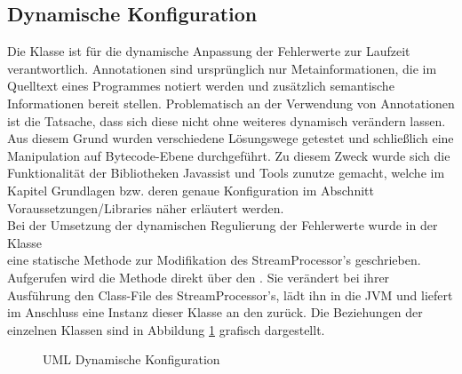 \subsection{Dynamische Konfiguration}

Die Klasse  ist f\"ur die dynamische Anpassung der Fehlerwerte zur Laufzeit verantwortlich. Annotationen sind urspr\"unglich nur Metainformationen, die im Quelltext eines Programmes notiert werden und zusätzlich semantische Informationen bereit stellen. Problematisch an der Verwendung von Annotationen ist die Tatsache, dass sich diese nicht ohne weiteres dynamisch verändern lassen. Aus diesem Grund wurden verschiedene L\"osungswege getestet und schlie\ss lich eine Manipulation auf Bytecode-Ebene durchgef\"uhrt. Zu diesem Zweck wurde sich die Funktionalit\"at der Bibliotheken Javassist und Tools zunutze gemacht, welche im Kapitel Grundlagen bzw. deren genaue Konfiguration im Abschnitt Voraussetzungen/Libraries n\"aher erl\"autert werden.\\
Bei der Umsetzung der dynamischen Regulierung der Fehlerwerte wurde in der Klasse\\  eine statische Methode zur Modifikation des  StreamProcessor's geschrieben. Aufgerufen wird die Methode direkt über den . Sie verändert bei ihrer Ausführung den Class-File des StreamProcessor's, lädt ihn in die JVM und liefert im Anschluss eine Instanz dieser Klasse an den  zur\"uck. Die Beziehungen der einzelnen Klassen sind in Abbildung \ref{AddRunTimeAnnotationUML} grafisch dargestellt. 

\begin{figure}[!htb]
\centering
	\caption{UML Dynamische Konfiguration}
 	\label{AddRunTimeAnnotationUML}
\end{figure}


